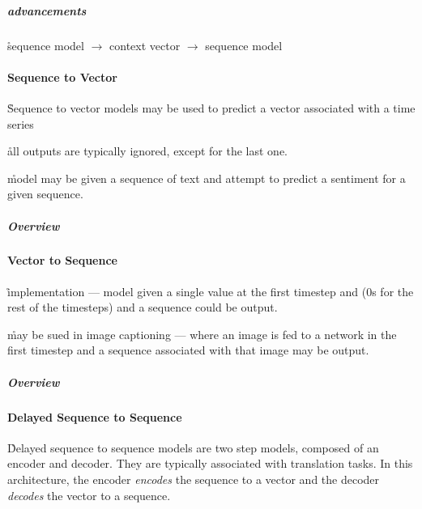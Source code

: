 \subparagraph{advancements}


\r{sequence model $\rightarrow$ context vector $\rightarrow$ sequence model}






\paragraph{Sequence to Vector}

\r{Sequence to vector models may be used to predict a vector associated with a time series}

\r{all outputs are typically ignored, except for the last one.}

\r{model may be given a sequence of text and attempt to predict a sentiment for a given sequence.}

\subparagraph{Overview}


\paragraph{Vector to Sequence}

\r{implementation --- model given a single value at the first timestep and (0s for the rest of the timesteps) and a sequence could be output.}

\r{may be sued in image captioning --- where an image is fed to a network in the first timestep and a sequence associated with that image may be output.}

\subparagraph{Overview}


\paragraph{Delayed Sequence to Sequence}

\r{Delayed sequence to sequence models are two step models, composed of an encoder and decoder. They are typically associated with translation tasks.  In this architecture, the encoder \textit{encodes} the sequence to a vector and the decoder \textit{decodes} the vector to a sequence.}

